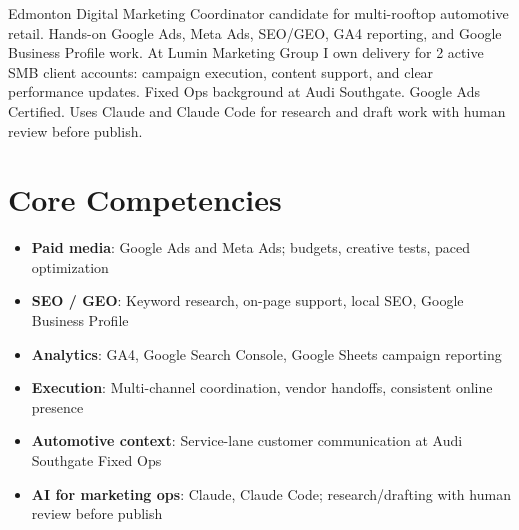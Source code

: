 \documentclass[11pt,a4paper,sans]{moderncv}
\begin{document}
\makecvtitle

\vspace{6pt}
\small{Edmonton Digital Marketing Coordinator candidate for multi-rooftop automotive retail. Hands-on Google Ads, Meta Ads, SEO/GEO, GA4 reporting, and Google Business Profile work. At Lumin Marketing Group I own delivery for 2 active SMB client accounts: campaign execution, content support, and clear performance updates. Fixed Ops background at Audi Southgate. Google Ads Certified. Uses Claude and Claude Code for research and draft work with human review before publish.}

\section{Core Competencies}
\vspace{1pt}
\begin{itemize}
\item \textbf{Paid media}: Google Ads and Meta Ads; budgets, creative tests, paced optimization
\item \textbf{SEO / GEO}: Keyword research, on-page support, local SEO, Google Business Profile
\item \textbf{Analytics}: GA4, Google Search Console, Google Sheets campaign reporting
\item \textbf{Execution}: Multi-channel coordination, vendor handoffs, consistent online presence
\item \textbf{Automotive context}: Service-lane customer communication at Audi Southgate Fixed Ops
\item \textbf{AI for marketing ops}: Claude, Claude Code; research/drafting with human review before publish
\end{itemize}
\end{document}
